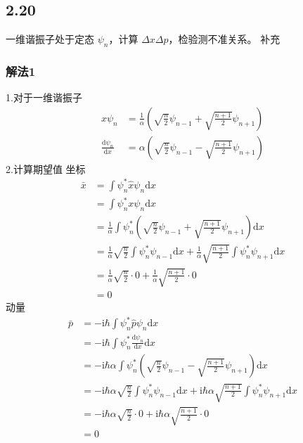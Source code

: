 \newpage
\subsection{2.20}
一维谐振子处于定态 $\psi_n$，计算 $\Delta x \Delta p$，检验测不准关系。
补充

\subsubsection{解法1}
1.对于一维谐振子
\begin{equation}
    \begin{aligned}
        x\psi _n&=\frac{1}{\alpha}\left( \sqrt{\frac{n}{2}}\psi _{n-1}+\sqrt{\frac{n+1}{2}}\psi _{n+1} \right) 
\\
\frac{\mathrm{d}\psi _n}{\mathrm{d}x}&=\alpha \left( \sqrt{\frac{n}{2}}\psi _{n-1}-\sqrt{\frac{n+1}{2}}\psi _{n+1} \right) 
    \end{aligned}
\end{equation}
2.计算期望值
坐标
\begin{equation}
    \begin{aligned}
        \bar{x}&=\int{\psi _{n}^{*}\hat{x}\psi _n\mathrm{d}x}
\\
&=\int{\psi _{n}^{*}x\psi _n\mathrm{d}x}
\\
&=\frac{1}{\alpha}\int{\psi _{n}^{*}\left( \sqrt{\frac{n}{2}}\psi _{n-1}+\sqrt{\frac{n+1}{2}}\psi _{n+1} \right) \mathrm{d}x}
\\
&=\frac{1}{\alpha}\sqrt{\frac{n}{2}}\int{\psi _{n}^{*}\psi _{n-1}\mathrm{d}x}+\frac{1}{\alpha}\sqrt{\frac{n+1}{2}}\int{\psi _{n}^{*}\psi _{n+1}\mathrm{d}x}
\\
&=\frac{1}{\alpha}\sqrt{\frac{n}{2}}\cdot 0+\frac{1}{\alpha}\sqrt{\frac{n+1}{2}}\cdot 0
\\
&=0
    \end{aligned}
\end{equation}
动量
\begin{equation}
    \begin{aligned}
        \bar{p}&=-\mathrm{i}\hbar \int{\psi _{n}^{*}\hat{p}\psi _n\mathrm{d}x}
\\
&=-\mathrm{i}\hbar \int{\psi _{n}^{*}\frac{\mathrm{d}\psi _n}{\mathrm{d}x}\mathrm{d}x}
\\
&=-\mathrm{i}\hbar \alpha \int{\psi _{n}^{*}\left( \sqrt{\frac{n}{2}}\psi _{n-1}-\sqrt{\frac{n+1}{2}}\psi _{n+1} \right) \mathrm{d}x}
\\
&=-\mathrm{i}\hbar \alpha \sqrt{\frac{n}{2}}\int{\psi _{n}^{*}\psi _{n-1}\mathrm{d}x}+\mathrm{i}\hbar \alpha \sqrt{\frac{n+1}{2}}\int{\psi _{n}^{*}\psi _{n+1}\mathrm{d}x}
\\
&=-\mathrm{i}\hbar \alpha \sqrt{\frac{n}{2}}\cdot 0+\mathrm{i}\hbar \alpha \sqrt{\frac{n+1}{2}}\cdot 0
\\
&=0
    \end{aligned}
\end{equation}
